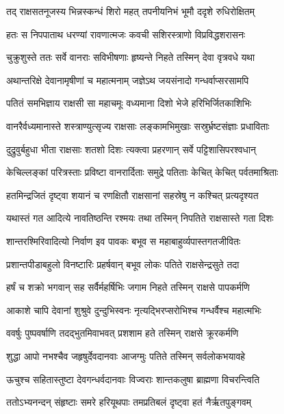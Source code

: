 \twolineshloka
{तद् राक्षसतनूजस्य भिन्नस्कन्धं शिरो महत्}
{तपनीयनिभं भूमौ ददृशे रुधिरोक्षितम्} %

\twolineshloka
{हतः स निपपाताथ धरण्यां रावणात्मजः}
{कवची सशिरस्त्राणो विप्रविद्धशरासनः} %

\twolineshloka
{चुक्रुशुस्ते ततः सर्वे वानराः सविभीषणाः}
{हृष्यन्ते निहते तस्मिन् देवा वृत्रवधे यथा} %

\twolineshloka
{अथान्तरिक्षे देवानामृषीणां च महात्मनाम्}
{जज्ञेऽथ जयसंनादो गन्धर्वाप्सरसामपि} %

\twolineshloka
{पतितं समभिज्ञाय राक्षसी सा महाचमूः}
{वध्यमाना दिशो भेजे हरिभिर्जितकाशिभिः} %

\twolineshloka
{वानरैर्वध्यमानास्ते शस्त्राण्युत्सृज्य राक्षसाः}
{लङ्कामभिमुखाः सस्रुर्भ्रष्टसंज्ञाः प्रधाविताः} %

\twolineshloka
{दुद्रुवुर्बहुधा भीता राक्षसाः शतशो दिशः}
{त्यक्त्वा प्रहरणान् सर्वे पट्टिशासिपरश्वधान्} %

\twolineshloka
{केचिल्लङ्कां परित्रस्ताः प्रविष्टा वानरार्दिताः}
{समुद्रे पतिताः केचित् केचित् पर्वतमाश्रिताः} %

\twolineshloka
{हतमिन्द्रजितं दृष्ट्वा शयानं च रणक्षितौ}
{राक्षसानां सहस्रेषु न कश्चित् प्रत्यदृश्यत} %

\twolineshloka
{यथास्तं गत आदित्ये नावतिष्ठन्ति रश्मयः}
{तथा तस्मिन् निपतिते राक्षसास्ते गता दिशः} %

\twolineshloka
{शान्तरश्मिरिवादित्यो निर्वाण इव पावकः}
{बभूव स महाबाहुर्व्यपास्तगतजीवितः} %

\twolineshloka
{प्रशान्तपीडाबहुलो विनष्टारिः प्रहर्षवान्}
{बभूव लोकः पतिते राक्षसेन्द्रसुते तदा} %

\twolineshloka
{हर्षं च शक्रो भगवान् सह सर्वैर्महर्षिभिः}
{जगाम निहते तस्मिन् राक्षसे पापकर्मणि} %

\twolineshloka
{आकाशे चापि देवानां शुश्रुवे दुन्दुभिस्वनः}
{नृत्यद्भिरप्सरोभिश्च गन्धर्वैश्च महात्मभिः} %

\twolineshloka
{ववर्षुः पुष्पवर्षाणि तदद्भुतमिवाभवत्}
{प्रशशाम हते तस्मिन् राक्षसे क्रूरकर्मणि} %

\twolineshloka
{शुद्धा आपो नभश्चैव जहृषुर्देवदानवाः}
{आजग्मुः पतिते तस्मिन् सर्वलोकभयावहे} %

\twolineshloka
{ऊचुश्च सहितास्तुष्टा देवगन्धर्वदानवाः}
{विज्वराः शान्तकलुषा ब्राह्मणा विचरन्त्विति} %

\twolineshloka
{ततोऽभ्यनन्दन् संहृष्टाः समरे हरियूथपाः}
{तमप्रतिबलं दृष्ट्वा हतं नैर्ऋतपुङ्गवम्} %


